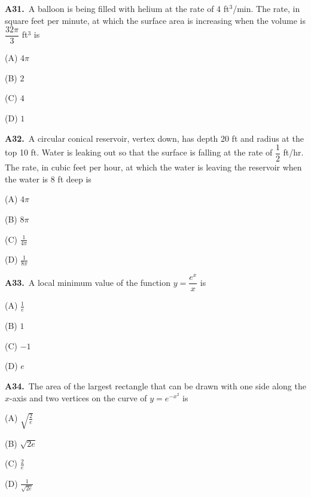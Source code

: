 \documentclass[11pt]{article}
\begin{document}
\bigskip\noindent\textbf{A31.}\ A balloon is being filled with helium at the rate of 4 ft$^3$/min. The rate, in square feet per minute, at which the surface area is increasing when the volume is $\dfrac{32\pi}{3}$ ft$^3$ is
\begin{list}{}{\setlength{\leftmargin}{3em}\setlength{\labelwidth}{2.5em}\setlength{\itemsep}{0pt}\setlength{\topsep}{2pt}}
\item[(A)] $4\pi$
\item[(B)] $2$
\item[(C)] $4$
\item[(D)] $1$
\end{list}

\bigskip\noindent\textbf{A32.}\ A circular conical reservoir, vertex down, has depth 20 ft and radius at the top 10 ft. Water is leaking out so that the surface is falling at the rate of $\dfrac{1}{2}$ ft/hr. The rate, in cubic feet per hour, at which the water is leaving the reservoir when the water is 8 ft deep is
\begin{list}{}{\setlength{\leftmargin}{3em}\setlength{\labelwidth}{2.5em}\setlength{\itemsep}{0pt}\setlength{\topsep}{2pt}}
\item[(A)] $4\pi$
\item[(B)] $8\pi$
\item[(C)] $\frac1{4\pi}$
\item[(D)] $\frac1{8\pi}$
\end{list}

\bigskip\noindent\textbf{A33.}\ A local minimum value of the function $y = \dfrac{e^x}{x}$ is
\begin{list}{}{\setlength{\leftmargin}{3em}\setlength{\labelwidth}{2.5em}\setlength{\itemsep}{0pt}\setlength{\topsep}{2pt}}
\item[(A)] $\frac1e$
\item[(B)] $1$
\item[(C)] $-1$
\item[(D)] $e$
\end{list}

\bigskip\noindent\textbf{A34.}\ The area of the largest rectangle that can be drawn with one side along the $x$-axis and two vertices on the curve of $y = e^{-x^2}$ is
\begin{list}{}{\setlength{\leftmargin}{3em}\setlength{\labelwidth}{2.5em}\setlength{\itemsep}{0pt}\setlength{\topsep}{2pt}}
\item[(A)] $\sqrt{\frac2e}$
\item[(B)] $\sqrt{2e}$
\item[(C)] $\frac2e$
\item[(D)] $\frac1{\sqrt{2e}}$
\end{list}
\end{document}
